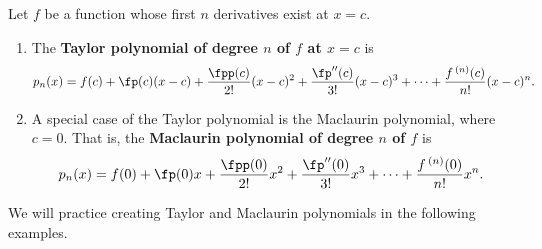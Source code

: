 \setboxwidth{50pt}
\noindent%
\begin{minipage}{\specialboxlength}
{Let $f$ be a function whose first $n$ derivatives exist at $x=c$.
 
\begin{enumerate}
\item		The \textbf{Taylor polynomial of degree $n$ of $f$ at $x=c$} is 
				{$$p_n(x) = f(c) + \fp(c)(x-c) + \frac{\fpp(c)}{2!}(x-c)^2+\frac{\fp''(c)}{3!}(x-c)^3+\cdots+\frac{f\,^{(n)}(c)}{n!}(x-c)^n.$$}

\item		A special case of the Taylor polynomial is the Maclaurin polynomial, where $c=0$. That is, the \textbf{Maclaurin polynomial of degree $n$ of $f$} is 
{$$p_n(x) = f(0) + \fp(0)x + \frac{\fpp(0)}{2!}x^2+\frac{\fp''(0)}{3!}x^3+\cdots+\frac{f\,^{(n)}(0)}{n!}x^n.$$}
\end{enumerate}
}
\end{minipage}
\restoreboxwidth

We will practice creating Taylor and Maclaurin polynomials in the following examples.\\

